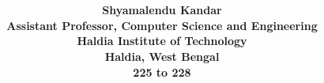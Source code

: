 \documentclass[a4paper,twoside,12pt]{book}
\begin{document}
\parindent 10pt

\title{\Huge\bf {}}
\author{\Large\bf{Shyamalendu Kandar}\\{Assistant Professor, Computer Science and Engineering}\\ {Haldia Institute of Technology}\\{Haldia, West Bengal}\\{\bf{225 to 228}}}
\maketitle


%


\mainmatter

%
%
%
%
%
%
%
%
%
%
%
%

%
%
\end{document}
